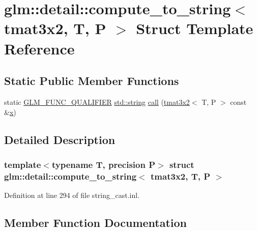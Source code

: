 \hypertarget{structglm_1_1detail_1_1compute__to__string_3_01tmat3x2_00_01_t_00_01_p_01_4}{}\section{glm\+::detail\+::compute\+\_\+to\+\_\+string$<$ tmat3x2, T, P $>$ Struct Template Reference}
\label{structglm_1_1detail_1_1compute__to__string_3_01tmat3x2_00_01_t_00_01_p_01_4}
\subsection*{Static Public Member Functions}
\begin{DoxyCompactItemize}
\item 
static \mbox{\hyperlink{setup_8hpp_a33fdea6f91c5f834105f7415e2a64407}{G\+L\+M\+\_\+\+F\+U\+N\+C\+\_\+\+Q\+U\+A\+L\+I\+F\+I\+ER}} \mbox{\hyperlink{glad_8h_ac83513893df92266f79a515488701770}{std\+::string}} \mbox{\hyperlink{structglm_1_1detail_1_1compute__to__string_3_01tmat3x2_00_01_t_00_01_p_01_4_a08dc9495d864f76f2b163459d1d81de9}{call}} (\mbox{\hyperlink{structglm_1_1tmat3x2}{tmat3x2}}$<$ T, P $>$ const \&\mbox{\hyperlink{glad_8h_a92d0386e5c19fb81ea88c9f99644ab1d}{x}})
\end{DoxyCompactItemize}


\subsection{Detailed Description}
\subsubsection*{template$<$typename T, precision P$>$\newline
struct glm\+::detail\+::compute\+\_\+to\+\_\+string$<$ tmat3x2, T, P $>$}



Definition at line 294 of file string\+\_\+cast.\+inl.



\subsection{Member Function Documentation}
\mbox{\label{structglm_1_1detail_1_1compute__to__string_3_01tmat3x2_00_01_t_00_01_p_01_4_a08dc9495d864f76f2b163459d1d81de9}} 
